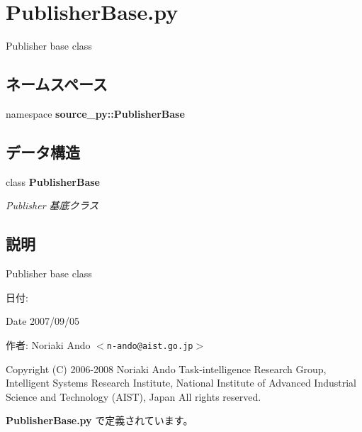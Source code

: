 \section{PublisherBase.py}
\label{_publisher_base_8py}
Publisher base class 

\subsection*{ネームスペース}
\begin{CompactItemize}
\item 
namespace \textbf{source\_\-py::PublisherBase}
\end{CompactItemize}
\subsection*{データ構造}
\begin{CompactItemize}
\item 
class {\bf PublisherBase}
\begin{CompactList}\small\item\em Publisher 基底クラス \item\end{CompactList}\end{CompactItemize}


\subsection{説明}
Publisher base class 

\begin{Desc}
\item[日付:]\end{Desc}
\begin{Desc}
\item[Date]2007/09/05\end{Desc}
\begin{Desc}
\item[作者:]Noriaki Ando $<${\tt n-ando@aist.go.jp}$>$\end{Desc}
Copyright (C) 2006-2008 Noriaki Ando Task-intelligence Research Group, Intelligent Systems Research Institute, National Institute of Advanced Industrial Science and Technology (AIST), Japan All rights reserved. 

 {\bf PublisherBase.py} で定義されています。